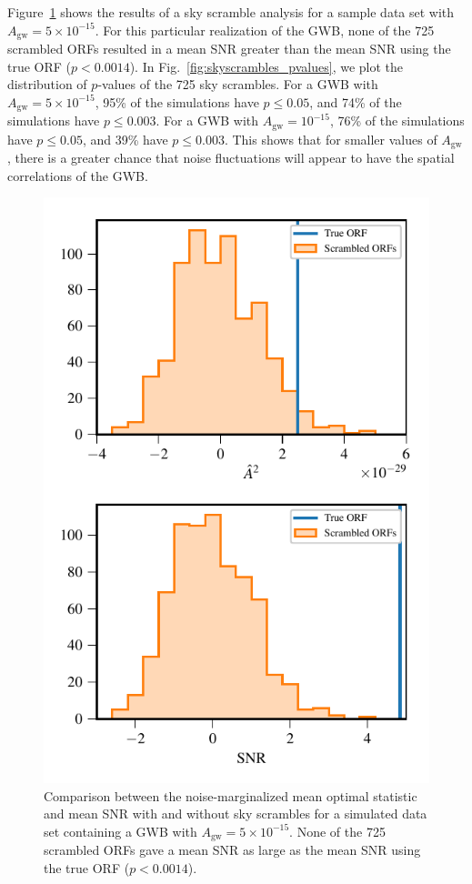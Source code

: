 \documentclass[twocolumn,aps,prd,superscriptaddress]{revtex4-1}
\newcommand{\Agw}{\ensuremath{A_\mathrm{gw}}}
\begin{document}
Figure~\ref{fig:skyscrambles_dataset_sample} shows the results of a sky scramble analysis 
for a sample data set with $\Agw=5\times10^{-15}$. 
For this particular realization of the GWB, 
none of the 725 scrambled ORFs resulted in a mean SNR greater than 
the mean SNR using the true ORF ($p < 0.0014$).
In Fig.~\ref{fig:skyscrambles_pvalues}, we plot the distribution of $p$-values of the 725 sky scrambles. 
For a GWB with $\Agw = 5\times10^{-15}$, 95\% of the simulations have $p \leq 0.05$, 
and 74\% of the simulations have $p \leq 0.003$. 
For a GWB with $\Agw = 10^{-15}$, 76\% of the simulations have $p \leq 0.05$, 
and 39\% have $p \leq 0.003$. 
This shows that for smaller values of \Agw, 
there is a greater chance that noise fluctuations will appear 
to have the spatial correlations of the GWB.
\begin{figure}[t]
	\includegraphics[width=0.9\columnwidth]{plots/optstat_scrambled_dataset11.pdf}
	\caption{Comparison between the noise-marginalized mean optimal statistic and mean SNR 
			with and without sky scrambles for a simulated data set 
			containing a GWB with $\Agw = 5\times10^{-15}$. 
			None of the 725 scrambled ORFs gave a mean SNR as large 
			as the mean SNR using the true ORF ($p < 0.0014$).}
	\label{fig:skyscrambles_dataset_sample}
\end{figure}
\end{document}
